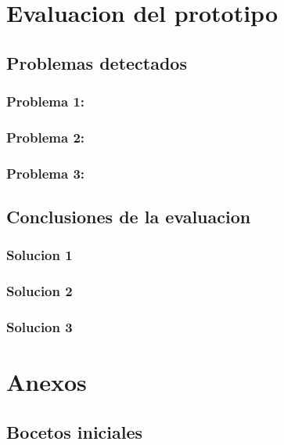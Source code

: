 \documentclass[a4paper,11pt]{article}
\begin{document}
\section{Evaluacion del prototipo}
\subsection{Problemas detectados}
\subsubsection{Problema 1:}
\subsubsection{Problema 2:}
\subsubsection{Problema 3:}

\subsection{Conclusiones de la evaluacion}
\subsubsection{Solucion 1}
\subsubsection{Solucion 2}
\subsubsection{Solucion 3}



\section{Anexos}
\subsection{Bocetos iniciales}\label{bocetos}
\end{document}
